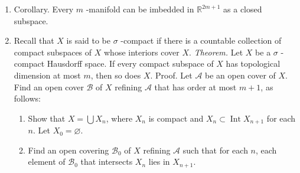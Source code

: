 \begin{enumerate}[itemsep=0.4em, parsep=0pt, topsep=0pt, partopsep=0pt, leftmargin=*, label=\arabic*., ref=\arabic*]
\begin{enumerate}[itemsep=0.2em, parsep=0pt, topsep=0pt, partopsep=0pt, leftmargin=*, label=(\alph*), align=left]
 \item Show that if \(N = {2m} + 1\), then \(U_{\epsilon }( C)\) is dense in \(\mathcal{C}({X,\mathbb{R}^{N}})\). [Hint: Given \(f\) and given \(\epsilon ,\delta > 0\), choose \(g : C \rightarrow {\mathbb{R}}^{N}\) so that \(d({f(x),g(x) }) < \delta\) for \(x \in C\), and \(\Delta ( g) < \epsilon\). Extend \(f - g\) to \(h : X \rightarrow {[ -\delta ,\delta ] }^{N}\) using the Tietze theorem.]
 \item Show there exists a map \(f : X \rightarrow \mathbb{R}\) such that \(f(x) \rightarrow \infty\) as \(x \rightarrow \infty\). [Hint: Write \(X\) as the union of compact subspaces \(C_{n}\) such that \(C_{n} \subset\) Int \(C_{n + 1}\) for each \(n\).]
 \item Let \(C_{n}\) be as in (e). Use the fact that \(\bigcap {U}_{1/n}(C_{n})\) is dense in \(\mathcal{C}({X,\mathbb{R}^{N}})\) to complete the proof.
 \end{enumerate}
\item Corollary. Every \(m\) -manifold can be imbedded in \(\mathbb{R}^{{2m} + 1}\) as a closed subspace.
\item Recall that \(X\) is said to be \(\sigma\) -compact if there is a countable collection of compact subspaces of \(X\) whose interiors cover \(X\). \textsl{Theorem.} Let \(X\) be a \(\sigma\) -compact Hausdorff space. If every compact subspace of \(X\) has topological dimension at most \(m\), then so does \(X\). Proof. Let \(\mathcal{A}\) be an open cover of \(X\). Find an open cover \(\mathcal{B}\) of \(X\) refining \(\mathcal{A}\) that has order at most \(m + 1\), as follows:
 \begin{enumerate}[itemsep=0.2em, parsep=0pt, topsep=0pt, partopsep=0pt, leftmargin=*, label=(\alph*), align=left]
 \item Show that \(X = \bigcup {X}_{n}\), where \(X_{n}\) is compact and \(X_{n} \subset \operatorname{Int}X_{n + 1}\) for each \(n\). Let \(X_{0} = \varnothing\).
 \item Find an open covering \(\mathcal{B}_{0}\) of \(X\) refining \(\mathcal{A}\) such that for each \(n\), each element of \(\mathcal{B}_{0}\) that intersects \(X_{n}\) lies in \(X_{n + 1}\).

\end{enumerate}
\end{enumerate}
